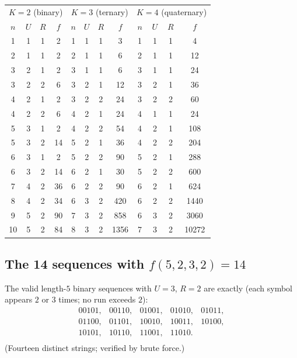 \documentclass[a4paper,12pt]{article}
\begin{document}
\begin{center}
\small
\begin{tabular}{cccc|cccc|cccc}
\toprule
\multicolumn{4}{c|}{$K=2$ (binary)} &
\multicolumn{4}{c|}{$K=3$ (ternary)} &
\multicolumn{4}{c}{$K=4$ (quaternary)} \\
$n$ & $U$ & $R$ & $f$ &
$n$ & $U$ & $R$ & $f$ &
$n$ & $U$ & $R$ & $f$ \\
\midrule
1 & 1 & 1 & 2   & 1 & 1 & 1 & 3    & 1 & 1 & 1 & 4    \\
2 & 1 & 1 & 2   & 2 & 1 & 1 & 6    & 2 & 1 & 1 & 12   \\
3 & 2 & 1 & 2   & 3 & 1 & 1 & 6    & 3 & 1 & 1 & 24   \\
3 & 2 & 2 & 6   & 3 & 2 & 1 & 12   & 3 & 2 & 1 & 36   \\
4 & 2 & 1 & 2   & 3 & 2 & 2 & 24   & 3 & 2 & 2 & 60   \\
4 & 2 & 2 & 6   & 4 & 2 & 1 & 24   & 4 & 1 & 1 & 24   \\
5 & 3 & 1 & 2   & 4 & 2 & 2 & 54   & 4 & 2 & 1 & 108  \\
5 & 3 & 2 & 14  & 5 & 2 & 1 & 36   & 4 & 2 & 2 & 204  \\
6 & 3 & 1 & 2   & 5 & 2 & 2 & 90   & 5 & 2 & 1 & 288  \\
6 & 3 & 2 & 14  & 6 & 2 & 1 & 30   & 5 & 2 & 2 & 600  \\
7 & 4 & 2 & 36  & 6 & 2 & 2 & 90   & 6 & 2 & 1 & 624  \\
8 & 4 & 2 & 34  & 6 & 3 & 2 & 420  & 6 & 2 & 2 & 1440 \\
9 & 5 & 2 & 90  & 7 & 3 & 2 & 858  & 6 & 3 & 2 & 3060 \\
10 & 5 & 2 & 84 & 8 & 3 & 2 & 1356 & 7 & 3 & 2 & 10272 \\
\bottomrule
\end{tabular}
\end{center}

\subsection{The 14 sequences with $f(5,2,3,2)=14$}
\label{app:list}

The valid length-$5$ binary sequences with $U=3$, $R=2$ are exactly
(each symbol appears $2$ or $3$ times; no run exceeds $2$):
\[
\begin{array}{lllll}
00101,&00110,&01001,&01010,&01011,\\
01100,&01101,&10010,&10011,&10100,\\
10101,&10110,&11001,&11010. & \\
\end{array}
\]
(Fourteen distinct strings; verified by brute force.)
\end{document}
